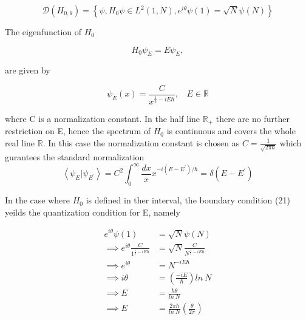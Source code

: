 \documentclass[12pt]{report}
\newcommand*{\1}{\hspace{1pt}}
\begin{document}
        \begin{equation}
             \mathcal{D}(H_{0,\theta}) = \left\{\psi, H_{0}\psi \in  L^{2} (1, N), e^{i\theta}\psi(1) = \sqrt{N}\psi(N)\right\}
        \end{equation}

        The eigenfunction of $H_{0}$ 

        \begin{equation}
            H_{0}\psi_{E} = E \psi_{E},
        \end{equation}

        are given by \cite{s1}

        \begin{equation}
            \psi _{E} (x) = \frac{C}{x^{\frac{1}{2}-iE\hbar}} , \ \ \ \ E \in \mathbb{R} 
        \end{equation}

        where C is a normalization constant. In the half line $\mathbb{R}_{+}$ there are no further restriction on E, hence the spectrum of $H_{0}$ is continuous 
        and covers the whole real line $\mathbb{R}$. In this case the normalization constant is chosen as $C = \frac{1}{\sqrt{2\pi\hbar}}$ which gurantees the standard 
        normalization
        \begin{equation}
            \left\langle\psi_{E}|\psi_{E^{'}}\right\rangle = C^{2} \int_{0}^{\infty} \frac{dx}{x} x^{-i(E-E^{'})/\hbar} = \delta (E-E^{'}) 
        \end{equation}

        In the case where $H_{0}$ is defined in ther interval, the boundary condition (21) yeilds the quantization condition for E, namely

        \begin{equation*}
            \begin{split}
                e^{i\theta} \psi(1) & = \sqrt{N}\psi(N) \\ 
                \implies e^{i\theta} \frac{C}{1^{\frac{1}{2}-iE\hbar}}&= \sqrt{N}\frac{C}{N^{\frac{1}{2}-iE\hbar}} \\ 
                \implies e^{i\theta} & = N^{-iE\hbar} \\ 
                \implies i\theta & = (\frac{-iE}{\hbar})ln \ N \\
                \implies E & = \frac{\hbar\theta}{ln \ N} \\
                \implies E & = \frac{2\pi\hbar}{ln \ N}( \frac{\theta}{2\pi}) \\
            \end{split}
        \end{equation*}
\end{document}
